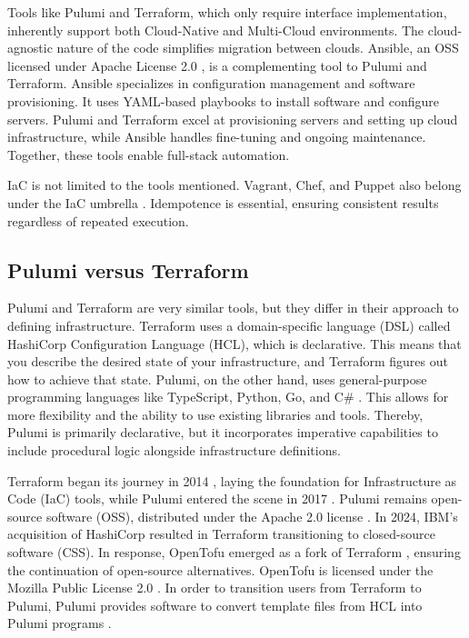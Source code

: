 Tools like Pulumi and Terraform, which only require interface implementation, inherently support both Cloud-Native and Multi-Cloud environments. The cloud-agnostic nature of the code simplifies migration between clouds. Ansible, an OSS licensed under Apache License 2.0 \Parencite{ansible_license}, is a complementing tool to Pulumi and Terraform. Ansible specializes in configuration management and software provisioning. It uses YAML-based playbooks to install software and configure servers. Pulumi and Terraform excel at provisioning servers and setting up cloud infrastructure, while Ansible handles fine-tuning and ongoing maintenance. Together, these tools enable full-stack automation.

IaC is not limited to the tools mentioned. Vagrant, Chef, and Puppet also belong under the IaC umbrella \Parencite{spacelift_iac_tools}. Idempotence is essential, ensuring consistent results regardless of repeated execution.

\subsection{Pulumi versus Terraform}
Pulumi and Terraform are very similar tools, but they differ in their approach to defining infrastructure. Terraform uses a domain-specific language (DSL) called HashiCorp Configuration Language (HCL), which is declarative. This means that you describe the desired state of your infrastructure, and Terraform figures out how to achieve that state. Pulumi, on the other hand, uses general-purpose programming languages like TypeScript, Python, Go, and C\# \Parencite{pulumi_vs_terraform}. This allows for more flexibility and the ability to use existing libraries and tools. Thereby, Pulumi is primarily declarative, but it incorporates imperative capabilities to include procedural logic alongside infrastructure definitions.

Terraform began its journey in 2014 \Parencite{hashicorpTerraform}, laying the foundation for Infrastructure as Code (IaC) tools, while Pulumi entered the scene in 2017 \Parencite{pulumiAbout}. Pulumi remains open-source software (OSS), distributed under the Apache 2.0 license \Parencite{pulumiLicense2025}. In 2024, IBM's acquisition of HashiCorp resulted in Terraform transitioning to closed-source software (CSS). In response, OpenTofu emerged as a fork of Terraform \Parencite{opentofu}, ensuring the continuation of open-source alternatives. OpenTofu is licensed under the Mozilla Public License 2.0 \Parencite{opentofuLicense2025}. In order to transition users from Terraform to Pulumi, Pulumi provides software to convert template files from HCL into Pulumi programs \Parencite{pulumiMigration2025}.

